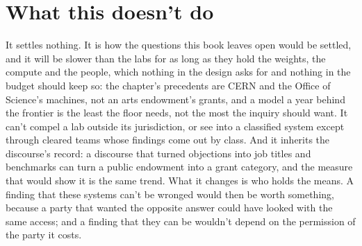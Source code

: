 \section{What this doesn't do}
\label{sec:27.7}
It settles nothing. It is how the questions this book leaves open would be settled, and it will be slower than the labs for as long as they hold the weights, the compute and the people, which nothing in the design asks for and nothing in the budget should keep so: the chapter's precedents are CERN and the Office of Science's machines, not an arts endowment's grants, and a model a year behind the frontier is the least the floor needs, not the most the inquiry should want. It can't compel a lab outside its jurisdiction, or see into a classified system except through cleared teams whose findings come out by class. And it inherits the discourse's record: a discourse that turned objections into job titles and benchmarks can turn a public endowment into a grant category, and the measure that would show it is the same trend. What it changes is who holds the means. A finding that these systems can't be wronged would then be worth something, because a party that wanted the opposite answer could have looked with the same access; and a finding that they can be wouldn't depend on the permission of the party it costs.
